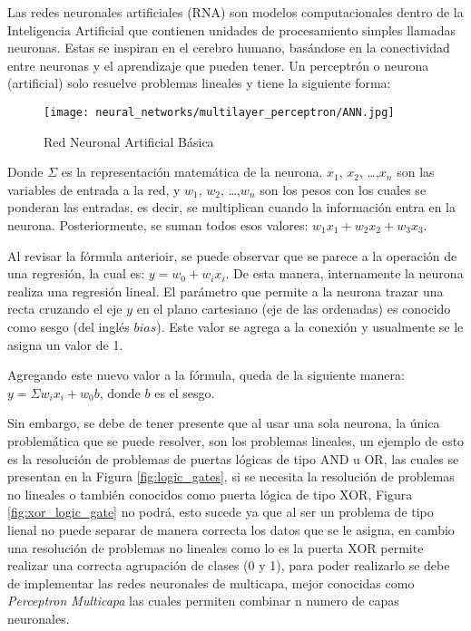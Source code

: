         Las redes neuronales artificiales (RNA) son modelos computacionales dentro de la Inteligencia Artificial que contienen unidades de procesamiento simples llamadas neuronas. Estas se inspiran en el cerebro humano, basándose en la conectividad entre neuronas y el aprendizaje que pueden tener. Un perceptrón o neurona (artificial) solo resuelve problemas lineales y tiene la siguiente forma:

        \begin{figure}[H]
            \centering
            \texttt{[image: neural\_networks/multilayer\_perceptron/ANN.jpg]}
            \caption{Red Neuronal Artificial Básica}
            \label{fig:nerural_network}
        \end{figure}

        Donde $\Sigma$ es la representación matemática de la neurona. $x_1$, $x_2$, \dots ,$x_n$ son las variables de entrada a la red, y $w_1$, $w_2$, \dots ,$w_n$ son los pesos con los cuales se ponderan las entradas, es decir, se multiplican cuando la información entra en la neurona. Posteriormente, se suman todos esos valores: $w_1 x_1 + w_2 x_2 + w_3 x_3$. 

        Al revisar la fórmula anterioir, se puede observar que se parece a la operación de una regresión, la cual es: $y = w_0 + w_i x_i$. De esta manera, internamente la neurona realiza una regresión lineal. El parámetro que permite a la neurona trazar una recta cruzando el eje $y$ en el plano cartesiano (eje de las ordenadas) es conocido como sesgo (del inglés $bias$). Este valor se agrega a la conexión y usualmente se le asigna un valor de 1.

        Agregando este nuevo valor a la fórmula, queda de la siguiente manera: $y = \Sigma w_i x_i + w_0 b$, donde $b$ es el sesgo. 

        Sin embargo, se debe de tener presente que al usar una sola neurona, la única problemática que se puede resolver, son los problemas lineales, un ejemplo de esto es la resolución de problemas de puertas lógicas de tipo AND u OR, las cuales se presentan en la Figura \ref{fig:logic_gates}, si se necesita la resolución de problemas no lineales o también conocidos como puerta lógica de tipo XOR, Figura  \ref{fig:xor_logic_gate} no podrá, esto sucede ya que al ser un problema de tipo lienal no puede separar de manera correcta los datos que se le asigna, en cambio una resolución de problemas no lineales como lo es la puerta XOR permite realizar una correcta agrupación de clases (0 y 1), para poder realizarlo se debe de implementar las redes neuronales de multicapa, mejor conocidas como \textit{Perceptron Multicapa} las cuales permiten combinar n numero de capas neuronales. 

